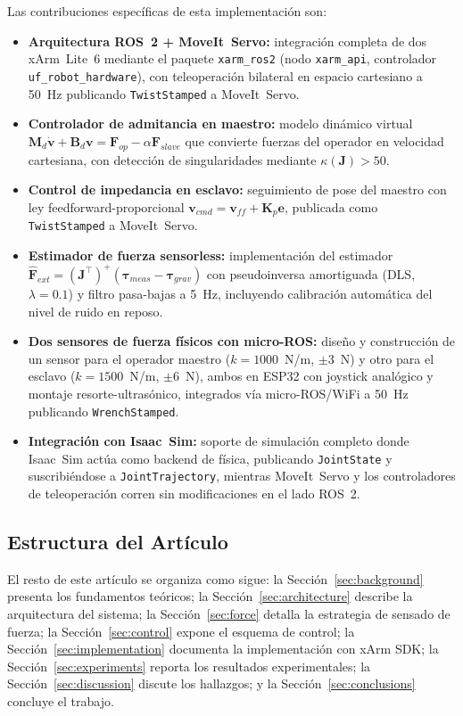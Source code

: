 \documentclass[journal,10pt,twoside]{IEEEtran}
\begin{document}
Las contribuciones específicas de esta implementación son:
\begin{itemize}[itemsep=0.2em]
  \item \textbf{Arquitectura ROS~2 + MoveIt~Servo:} integración completa
        de dos xArm~Lite~6 mediante el paquete \texttt{xarm\_ros2}
        (nodo \texttt{xarm\_api}, controlador \texttt{uf\_robot\_hardware}),
        con teleoperación bilateral en espacio cartesiano a 50~Hz
        publicando \texttt{TwistStamped} a MoveIt~Servo.
  \item \textbf{Controlador de admitancia en maestro:} modelo dinámico
        virtual $\bm{M}_d\dot{\bm{v}} + \bm{B}_d\bm{v} =
        \bm{F}_{op} - \alpha\bm{F}_{slave}$ que convierte fuerzas del
        operador en velocidad cartesiana, con detección de singularidades
        mediante $\kappa(\bm{J}) > 50$.
  \item \textbf{Control de impedancia en esclavo:} seguimiento de pose
        del maestro con ley feedforward-proporcional
        $\bm{v}_{cmd} = \bm{v}_{ff} + \bm{K}_p\bm{e}$,
        publicada como \texttt{TwistStamped} a MoveIt~Servo.
  \item \textbf{Estimador de fuerza sensorless:} implementación del
        estimador $\hat{\bm{F}}_{ext} = (\bm{J}^\top)^+
        (\bm{\tau}_{meas} - \bm{\tau}_{grav})$ con pseudoinversa
        amortiguada (DLS, $\lambda=0.1$) y filtro pasa-bajas a 5~Hz,
        incluyendo calibración automática del nivel de ruido en reposo.
  \item \textbf{Dos sensores de fuerza físicos con micro-ROS:} diseño y
        construcción de un sensor para el operador maestro
        ($k=1000$~N/m, $\pm3$~N) y otro para el esclavo
        ($k=1500$~N/m, $\pm6$~N), ambos en ESP32 con joystick analógico
        y montaje resorte-ultrasónico, integrados vía micro-ROS/WiFi
        a 50~Hz publicando \texttt{WrenchStamped}.
  \item \textbf{Integración con Isaac~Sim:} soporte de simulación
        completo donde Isaac~Sim actúa como backend de física,
        publicando \texttt{JointState} y suscribiéndose a
        \texttt{JointTrajectory}, mientras MoveIt~Servo y los
        controladores de teleoperación corren sin modificaciones en
        el lado ROS~2.
\end{itemize}

\subsection{Estructura del Artículo}
El resto de este artículo se organiza como sigue:
la Sección~\ref{sec:background} presenta los fundamentos teóricos;
la Sección~\ref{sec:architecture} describe la arquitectura del sistema;
la Sección~\ref{sec:force} detalla la estrategia de sensado de fuerza;
la Sección~\ref{sec:control} expone el esquema de control;
la Sección~\ref{sec:implementation} documenta la implementación con xArm SDK;
la Sección~\ref{sec:experiments} reporta los resultados experimentales;
la Sección~\ref{sec:discussion} discute los hallazgos;
y la Sección~\ref{sec:conclusions} concluye el trabajo.
\end{document}
